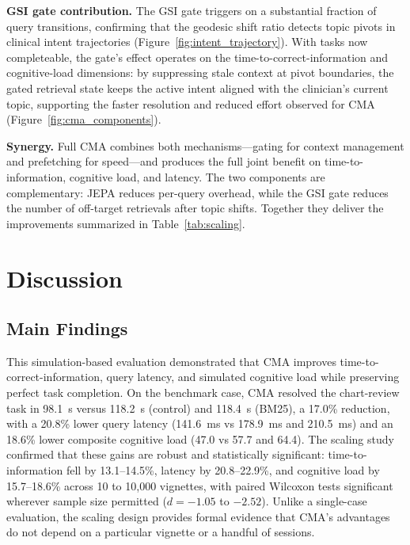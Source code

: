 \documentclass[preprint,12pt]{elsarticle}
\begin{document}
\textbf{GSI gate contribution.} The GSI gate triggers on a substantial fraction of query transitions, confirming that the geodesic shift ratio detects topic pivots in clinical intent trajectories (Figure~\ref{fig:intent_trajectory}). With tasks now completeable, the gate's effect operates on the time-to-correct-information and cognitive-load dimensions: by suppressing stale context at pivot boundaries, the gated retrieval state keeps the active intent aligned with the clinician's current topic, supporting the faster resolution and reduced effort observed for CMA (Figure~\ref{fig:cma_components}).

\textbf{Synergy.} Full CMA combines both mechanisms---gating for context management and prefetching for speed---and produces the full joint benefit on time-to-information, cognitive load, and latency. The two components are complementary: JEPA reduces per-query overhead, while the GSI gate reduces the number of off-target retrievals after topic shifts. Together they deliver the improvements summarized in Table~\ref{tab:scaling}.

\section{Discussion}

\subsection{Main Findings}
This simulation-based evaluation demonstrated that CMA improves time-to-correct-information, query latency, and simulated cognitive load while preserving perfect task completion. On the benchmark case, CMA resolved the chart-review task in 98.1~s versus 118.2~s (control) and 118.4~s (BM25), a 17.0\% reduction, with a 20.8\% lower query latency (141.6~ms vs 178.9~ms and 210.5~ms) and an 18.6\% lower composite cognitive load (47.0 vs 57.7 and 64.4). The scaling study confirmed that these gains are robust and statistically significant: time-to-information fell by 13.1--14.5\%, latency by 20.8--22.9\%, and cognitive load by 15.7--18.6\% across 10 to 10{,}000 vignettes, with paired Wilcoxon tests significant wherever sample size permitted ($d = -1.05$ to $-2.52$). Unlike a single-case evaluation, the scaling design provides formal evidence that CMA's advantages do not depend on a particular vignette or a handful of sessions.
\end{document}
